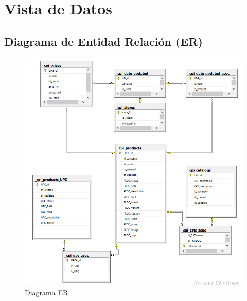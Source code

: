\section{Vista de Datos} \label{vistaDatos}
    \subsection{Diagrama de Entidad Relación (ER)}
    \begin{figure}[H]
        \includegraphics[scale=0.8]{er.png}
        \caption{Diagrama ER}
        \label{fig:er_diagram}
        \centering
    \end{figure}